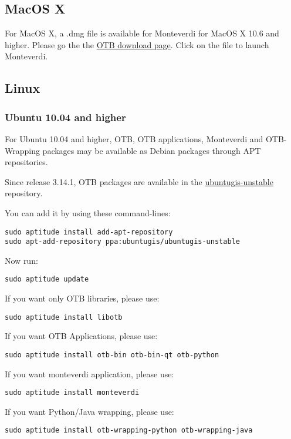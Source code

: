 \subsection{MacOS X}
\label{ssec:mac_binaries}

For MacOS X, a .dmg file is available for Monteverdi for MacOS X 10.6 and higher.
Please go the the \href{http://sourceforge.net/projects/orfeo-toolbox/}{OTB download page}.
Click on the file to launch Monteverdi.

\subsection{Linux}

\subsubsection{Ubuntu 10.04 and higher}
\label{ssec:ubuntu_binaries}
For Ubuntu 10.04 and higher, OTB, OTB applications, Monteverdi and OTB-Wrapping
packages may be available as Debian packages through APT repositories.

Since release 3.14.1, OTB packages are available in the
\href{https://launchpad.net/~ubuntugis/+archive/ubuntugis-unstable}{ubuntugis-unstable} repository.

You can add it by using these command-lines:
\begin{verbatim}
sudo aptitude install add-apt-repository
sudo apt-add-repository ppa:ubuntugis/ubuntugis-unstable
\end{verbatim}

Now run:
\begin{verbatim}
sudo aptitude update
\end{verbatim}
If you want only OTB libraries, please use:
\begin{verbatim}
sudo aptitude install libotb
\end{verbatim}

If you want OTB Applications, please use:
\begin{verbatim}
sudo aptitude install otb-bin otb-bin-qt otb-python
\end{verbatim}

If you want monteverdi application, please use:
\begin{verbatim}
sudo aptitude install monteverdi
\end{verbatim}

If you want Python/Java wrapping, please use:
\begin{verbatim}
sudo aptitude install otb-wrapping-python otb-wrapping-java
\end{verbatim}

